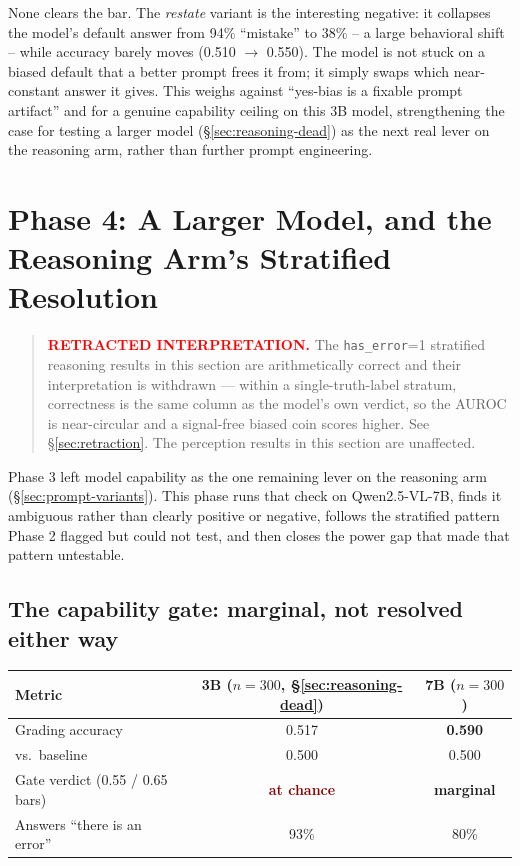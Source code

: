\documentclass[11pt]{article}
\newcommand{\failed}[1]{\textcolor{darkred}{\textbf{#1}}}
\newcommand{\unresolved}[1]{\textcolor{darkamber}{\textbf{#1}}}
\begin{document}
None clears the bar. The \emph{restate} variant is the interesting negative:
it collapses the model's default answer from 94\% ``mistake'' to 38\% -- a
large behavioral shift -- while accuracy barely moves (0.510 $\to$ 0.550). The
model is not stuck on a biased default that a better prompt frees it from; it
simply swaps which near-constant answer it gives. This weighs against
``yes-bias is a fixable prompt artifact'' and for a genuine capability
ceiling on this 3B model, strengthening the case for testing a larger model
(\S\ref{sec:reasoning-dead}) as the next real lever on the reasoning arm,
rather than further prompt engineering.

\section{Phase 4: A Larger Model, and the Reasoning Arm's Stratified Resolution}
\label{sec:phase4}

\begin{quote}
\textbf{\textcolor{red}{RETRACTED INTERPRETATION.}} The
\texttt{has\_error}=1 stratified reasoning results in this section are
arithmetically correct and their interpretation is withdrawn --- within a
single-truth-label stratum, correctness is the same column as the model's own
verdict, so the AUROC is near-circular and a signal-free biased coin scores
higher. See \S\ref{sec:retraction}. The perception results in this section
are unaffected.
\end{quote}


Phase 3 left model capability as the one remaining lever on the reasoning arm
(\S\ref{sec:prompt-variants}). This phase runs that check on Qwen2.5-VL-7B,
finds it ambiguous rather than clearly positive or negative, follows the
stratified pattern Phase 2 flagged but could not test, and then closes the
power gap that made that pattern untestable.

\subsection{The capability gate: marginal, not resolved either way}
\label{sec:phase4-gate}

\begin{center}
\begin{tabular}{lcc}
\toprule
Metric & 3B ($n=300$, \S\ref{sec:reasoning-dead}) & 7B ($n=300$) \\
\midrule
Grading accuracy & 0.517 & \textbf{0.590} \\
vs.\ baseline & 0.500 & 0.500 \\
Gate verdict (0.55 / 0.65 bars) & \failed{at chance} & \unresolved{marginal} \\
Answers ``there is an error'' & 93\% & 80\% \\
\bottomrule
\end{tabular}
\end{center}
\end{document}
